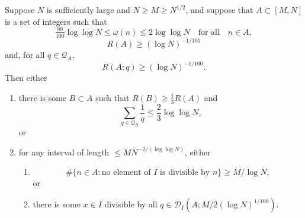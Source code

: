 \begin{proposition}\label{prop:tech_iterative}
  \leanok
Suppose $N$ is sufficiently large and $N\geq M\geq N^{1/2}$, and suppose that $A\subset [M,N]$ is a set of integers such that
\[\tfrac{99}{100}\log\log N\leq \omega(n)\leq  2\log\log N\quad\textrm{for all}\quad n\in A,\]
\[R(A)\geq (\log N)^{-1/101}\]
and, for all $q\in \mathcal{Q}_A$,
\[R(A;q) \geq (\log N)^{-1/100}.\]
Then either
\begin{enumerate}
\item there is some $B\subset A$ such that $R(B)\geq \tfrac{1}{3}R(A)$ and
\[\sum_{q\in \mathcal{Q}_{B}}\frac{1}{q}\leq \frac{2}{3}\log\log N,\]
or
\item for any interval of length $\leq MN^{-2/(\log \log N)}$, either
\begin{enumerate}
\item \[\# \{ n\in A : \textrm{no element of }I\textrm{ is divisible by }n\}\geq M/\log N,\]
or
\item there is some $x\in I$ divisible by all $q\in\mathcal{D}_I(A;M/2(\log N)^{1/100})$.
\end{enumerate}
\end{enumerate}
\end{proposition}
